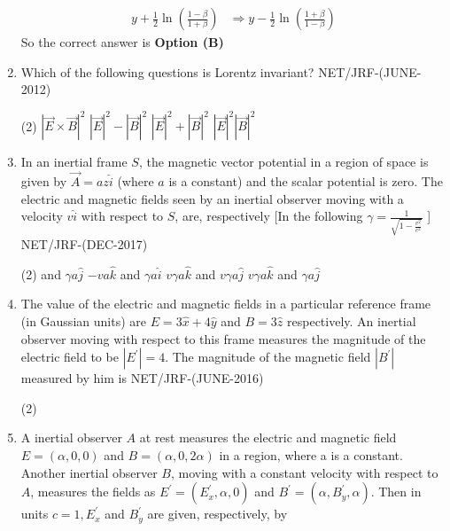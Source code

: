 \begin{enumerate}
\begin{answer}
\begin{align*}
y+\frac{1}{2} \ln \left(\frac{1-\beta}{1+\beta}\right) &\Rightarrow y-\frac{1}{2} \ln \left(\frac{1+\beta}{1-\beta}\right)
\end{align*}
So the correct answer is \textbf{Option (B)}
\end{answer}
	\item Which of the following questions is Lorentz invariant?
{	NET/JRF-(JUNE-2012)}
 \begin{tasks}(2)
	\task[\textbf{a.}]$|\vec{E} \times \vec{B}|^{2}$
	\task[\textbf{b.}] $|\vec{E}|^{2}-|\vec{B}|^{2}$
	\task[\textbf{c.}]$|\vec{E}|^{2}+|\vec{B}|^{2}$
	\task[\textbf{d.}] $|\vec{E}|^{2}|\vec{B}|^{2}$
\end{tasks}
\item In an inertial frame $S$, the magnetic vector potential in a region of space is given by $\vec{A}=a z \hat{i}$ (where $a$ is a constant) and the scalar potential is zero. The electric and magnetic fields seen by an inertial observer moving with a velocity $v \hat{i}$ with respect to $S$, are, respectively [In the following $\gamma=\frac{1}{\sqrt{1-\frac{v^{2}}{c^{2}}}}$ ] 
{NET/JRF-(DEC-2017)}
 \begin{tasks}(2)
	 and $\gamma a \hat{j}$
	\task[\textbf{b.}]$-v a \hat{k}$ and $\gamma a \hat{i}$
	\task[\textbf{c.}]$v \gamma a \hat{k}$ and $v \gamma a \hat{j}$
	\task[\textbf{d.}] $v \gamma a \hat{k}$ and $\gamma a \hat{j}$
\end{tasks}
\item The value of the electric and magnetic fields in a particular reference frame (in Gaussian units) are $E=3 \hat{x}+4 \hat{y}$ and $B=3 \hat{z}$ respectively. An inertial observer moving with respect to this frame measures the magnitude of the electric field to be $\left|E^{\prime}\right|=4$. The magnitude of the magnetic field $\left|B^{\prime}\right|$ measured by him is
{NET/JRF-(JUNE-2016)}
 \begin{tasks}(2)
\end{tasks}
\item A inertial observer $A$ at rest measures the electric and magnetic field $E=(\alpha, 0,0)$ and $B=(\alpha, 0,2 \alpha)$ in a region, where a is a constant. Another inertial observer $B$, moving with a constant velocity with respect to $A$, measures the fields as $E^{\prime}=\left(E_{x}^{\prime}, \alpha, 0\right)$ and $B^{\prime}=\left(\alpha, B_{y}^{\prime}, \alpha\right)$. Then in units $c=1, E_{x}^{\prime}$ and $B_{y}^{\prime}$ are given, respectively, by

\end{enumerate}
